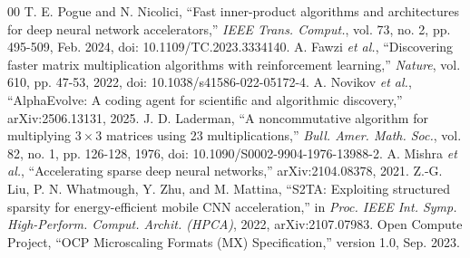 \documentclass[conference]{IEEEtran}
\begin{document}
\begin{thebibliography}{00}
 T. E. Pogue and N. Nicolici, ``Fast inner-product algorithms and architectures for deep neural network accelerators,'' \emph{IEEE Trans. Comput.}, vol. 73, no. 2, pp. 495-509, Feb. 2024, doi: 10.1109/TC.2023.3334140.
 A. Fawzi \emph{et al.}, ``Discovering faster matrix multiplication algorithms with reinforcement learning,'' \emph{Nature}, vol. 610, pp. 47-53, 2022, doi: 10.1038/s41586-022-05172-4.
 A. Novikov \emph{et al.}, ``AlphaEvolve: A coding agent for scientific and algorithmic discovery,'' arXiv:2506.13131, 2025.
 J. D. Laderman, ``A noncommutative algorithm for multiplying $3 \times 3$ matrices using 23 multiplications,'' \emph{Bull. Amer. Math. Soc.}, vol. 82, no. 1, pp. 126-128, 1976, doi: 10.1090/S0002-9904-1976-13988-2.
 A. Mishra \emph{et al.}, ``Accelerating sparse deep neural networks,'' arXiv:2104.08378, 2021.
 Z.-G. Liu, P. N. Whatmough, Y. Zhu, and M. Mattina, ``S2TA: Exploiting structured sparsity for energy-efficient mobile CNN acceleration,'' in \emph{Proc. IEEE Int. Symp. High-Perform. Comput. Archit. (HPCA)}, 2022, arXiv:2107.07983.
 Open Compute Project, ``OCP Microscaling Formats (MX) Specification,'' version 1.0, Sep. 2023.
\end{thebibliography}
\end{document}

